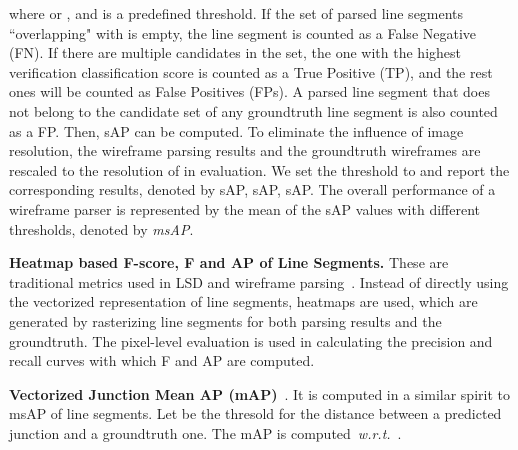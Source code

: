 \documentclass[10pt,twocolumn,letterpaper]{article}
\begin{document}
where  or , and  is a predefined threshold. 
If the set of parsed line segments ``overlapping" with  is empty, the line segment  is counted as a False Negative (FN). If there are multiple candidates in the set, the one with the highest verification classification score is counted as a True Positive (TP), and the rest ones will be counted as False Positives (FPs).
A parsed line segment that does not belong to the candidate set of any groundtruth line segment is also counted as a FP. Then, sAP can be computed. 
To eliminate the influence of image resolution, the wireframe parsing results and the groundtruth wireframes are rescaled to the resolution of  in evaluation. 
We set the threshold  to  and report the corresponding results, denoted by sAP, sAP, sAP. 
The overall performance of a wireframe parser is represented by the mean of the sAP values with different thresholds, denoted by \textit{msAP}.

\textbf{{Heatmap based F-score, F and AP of Line Segments.}} These are traditional metrics used in LSD and wireframe parsing~\cite{Huang2018a}. Instead of directly using the vectorized representation of line segments, heatmaps are used, which are generated by rasterizing line segments for both parsing results and the groundtruth. The pixel-level evaluation is used in calculating the precision and recall curves with which F and AP are computed.

\textbf{{Vectorized Junction Mean AP (mAP)}}~\cite{ZhouQM19}. It is computed in a similar spirit to msAP of line segments. Let  be the thresold for the distance between a predicted junction and a groundtruth one. The mAP is computed~\emph{w.r.t.}~.    
\end{document}
